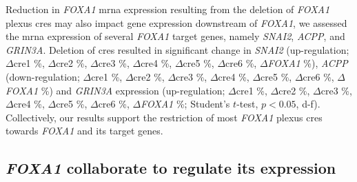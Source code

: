 Reduction in \emph{FOXA1} \gls{mrna} expression resulting from the deletion of \emph{FOXA1} plexus \glspl{cre} may also impact gene expression downstream of \emph{FOXA1}, we assessed the \gls{mrna} expression of several \emph{FOXA1} target genes, namely \emph{SNAI2}, \emph{ACPP}, and \emph{GRIN3A}.
Deletion of \glspl{cre} resulted in significant change in \emph{SNAI2} (up-regulation; $\Delta$\gls{cre}1 \%, $\Delta$\gls{cre}2 \%, $\Delta$\gls{cre}3 \%, $\Delta$\gls{cre}4 \%, $\Delta$\gls{cre}5 \%, $\Delta$\gls{cre}6 \%, $\Delta$\emph{FOXA1} \%), \emph{ACPP} (down-regulation; $\Delta$\gls{cre}1 \%, $\Delta$\gls{cre}2 \%, $\Delta$\gls{cre}3 \%, $\Delta$\gls{cre}4 \%, $\Delta$\gls{cre}5 \%, $\Delta$\gls{cre}6 \%, $\Delta$\emph{FOXA1} \%) and \emph{GRIN3A} expression (up-regulation; $\Delta$\gls{cre}1 \%, $\Delta$\gls{cre}2 \%, $\Delta$\gls{cre}3 \%, $\Delta$\gls{cre}4 \%, $\Delta$\gls{cre}5 \%, $\Delta$\gls{cre}6 \%, $\Delta$\emph{FOXA1} \%; Student's $t$-test, $p < 0.05$, d-f).
Collectively, our results support the restriction of most \emph{FOXA1} plexus \glspl{cre} towards \emph{FOXA1} and its target genes.

\subsection{\emph{FOXA1}  collaborate to regulate its expression}

